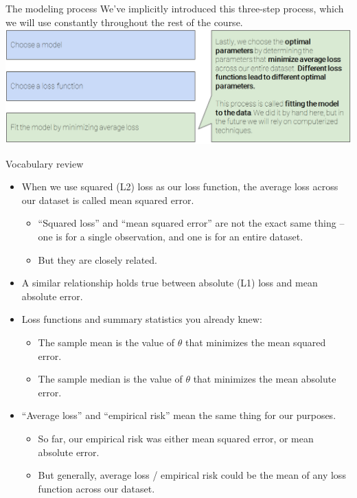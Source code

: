 \documentclass[aspectratio=169]{../latex_main/tntbeamer}  %
\begin{document}
	
	
	\begin{frame}{The modeling process}
	    We’ve implicitly introduced this three-step process, which we will use constantly throughout the rest of the course.\\
	    \includegraphics[scale=.4]{Bild50}
	\end{frame}
	
	
	
	\begin{frame}{Vocabulary review}
	    \begin{itemize}
	        \item When we use squared (L2) loss as our loss function, the average loss across our dataset is called mean squared error.
	        \begin{itemize}
	            \item “Squared loss” and “mean squared error” are not the exact same thing – one is for a single observation, and one is for an entire dataset.
	            \item But they are closely related.
	        \end{itemize}
	        \item A similar relationship holds true between absolute (L1) loss and mean absolute error.
	        \item Loss functions and summary statistics you already knew:
	        \begin{itemize}
	            \item The sample mean is the value of   $\theta$  that minimizes the mean squared error.
	            \item The sample median is the value of  $\theta$   that minimizes the mean absolute error.
	        \end{itemize}
	        \item “Average loss” and “empirical risk” mean the same thing for our purposes.
	        \begin{itemize}
	            \item So far, our empirical risk was either mean squared error, or mean absolute error.
	            \item  But generally, average loss / empirical risk could be the mean of any loss function across our dataset.
	        \end{itemize}
	    \end{itemize}
	\end{frame}
	
\end{document}
